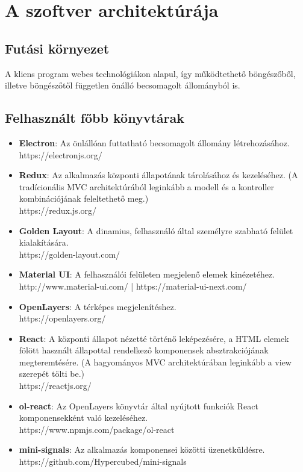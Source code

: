 \section{A szoftver architektúrája}

\subsection{Futási környezet}

A kliens program webes technológiákon alapul, így működtethető böngészőből,
illetve böngészőtől független önálló becsomagolt állományból is.

\subsection{Felhasznált főbb könyvtárak}

\begin{itemize}
  \item \textbf{Electron}: Az önlállóan futtatható becsomagolt állomány
  létrehozásához. \\
  https://electronjs.org/

  \item \textbf{Redux}: Az alkalmazás központi állapotának tárolásához és
  kezeléséhez. (A tradícionális MVC architektúrából leginkább a modell és a
  kontroller kombinációjának feleltethető meg.) \\
  https://redux.js.org/

  \item \textbf{Golden Layout}: A dinamius, felhasználó által személyre szabható
  felület kialakítására. \\
  https://golden-layout.com/

  \item \textbf{Material UI}: A felhasználói felületen megjelenő elemek
  kinézetéhez. \\
  http://www.material-ui.com/ | https://material-ui-next.com/

  \item \textbf{OpenLayers}: A térképes megjelenítéshez. \\
  https://openlayers.org/

  \item \textbf{React}: A központi állapot nézetté történő leképezésére, a HTML
  elemek fölött használt állapottal rendelkező komponensek absztrakciójának
  megteremtésére. (A hagyományos MVC architektúrában leginkább a view szerepét
  tölti be.) \\
  https://reactjs.org/

  \item \textbf{ol-react}: Az OpenLayers könyvtár által nyújtott funkciók React
  komponensekként való kezeléséhez. \\
  https://www.npmjs.com/package/ol-react

  \item \textbf{mini-signals}: Az alkalmazás komponensei közötti üzenetküldésre.
  \\
  https://github.com/Hypercubed/mini-signals
\end{itemize}

